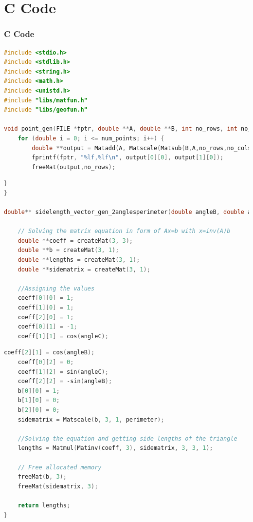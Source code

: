 \documentclass{beamer}
\theoremstyle{remark}
\numberwithin{equation}{section}
\begin{document}
\section{C Code}
\begin{frame}[fragile]
\frametitle{C Code}
\begin{lstlisting}[language=C]
#include <stdio.h>
#include <stdlib.h>
#include <string.h>
#include <math.h>
#include <unistd.h>
#include "libs/matfun.h"
#include "libs/geofun.h"

void point_gen(FILE *fptr, double **A, double **B, int no_rows, int no_cols, int num_points) {
    for (double i = 0; i <= num_points; i++) {
        double **output = Matadd(A, Matscale(Matsub(B,A,no_rows,no_cols),no_rows,no_cols,(double)i/num_points), no_rows, no_cols);
        fprintf(fptr, "%lf,%lf\n", output[0][0], output[1][0]);
        freeMat(output,no_rows);
\end{lstlisting}
\end{frame}
\begin{frame}[fragile]
\begin{lstlisting}[language=C]
	}
}

double** sidelength_vector_gen_2anglesperimeter(double angleB, double angleC, double perimeter) {

    // Solving the matrix equation in form of Ax=b with x=inv(A)b
    double **coeff = createMat(3, 3);
    double **b = createMat(3, 1);
    double **lengths = createMat(3, 1);
    double **sidematrix = createMat(3, 1);
    
    //Assigning the values
    coeff[0][0] = 1;
    coeff[1][0] = 1;
    coeff[2][0] = 1;
    coeff[0][1] = -1;
    coeff[1][1] = cos(angleC);
\end{lstlisting}
\end{frame}
\begin{frame}[fragile]
\begin{lstlisting}[language=C]
    coeff[2][1] = cos(angleB);
    coeff[0][2] = 0;
    coeff[1][2] = sin(angleC);
    coeff[2][2] = -sin(angleB);
    b[0][0] = 1;
    b[1][0] = 0;
    b[2][0] = 0;
    sidematrix = Matscale(b, 3, 1, perimeter);
    
    //Solving the equation and getting side lengths of the triangle
    lengths = Matmul(Matinv(coeff, 3), sidematrix, 3, 3, 1);
    
    // Free allocated memory
    freeMat(b, 3);
    freeMat(sidematrix, 3);
    
    return lengths;
}
\end{lstlisting}
\end{frame}
\end{document}
